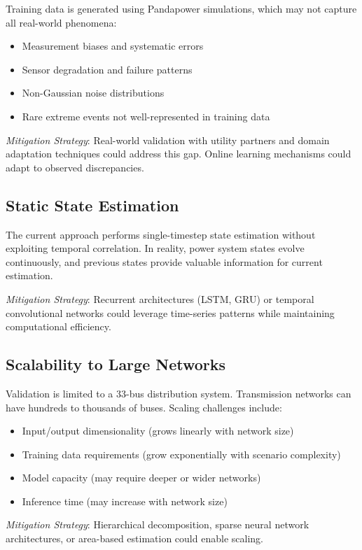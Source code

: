 \documentclass[12pt,a4paper]{report}
\begin{document}
Training data is generated using Pandapower simulations, which may not capture all real-world phenomena:
\begin{itemize}
    \item Measurement biases and systematic errors
    \item Sensor degradation and failure patterns
    \item Non-Gaussian noise distributions
    \item Rare extreme events not well-represented in training data
\end{itemize}

\textit{Mitigation Strategy}: Real-world validation with utility partners and domain adaptation techniques could address this gap. Online learning mechanisms could adapt to observed discrepancies.

\subsection{Static State Estimation}

The current approach performs single-timestep state estimation without exploiting temporal correlation. In reality, power system states evolve continuously, and previous states provide valuable information for current estimation.

\textit{Mitigation Strategy}: Recurrent architectures (LSTM, GRU) or temporal convolutional networks could leverage time-series patterns while maintaining computational efficiency.

\subsection{Scalability to Large Networks}

Validation is limited to a 33-bus distribution system. Transmission networks can have hundreds to thousands of buses. Scaling challenges include:
\begin{itemize}
    \item Input/output dimensionality (grows linearly with network size)
    \item Training data requirements (grow exponentially with scenario complexity)
    \item Model capacity (may require deeper or wider networks)
    \item Inference time (may increase with network size)
\end{itemize}

\textit{Mitigation Strategy}: Hierarchical decomposition, sparse neural network architectures, or area-based estimation could enable scaling.
\end{document}
